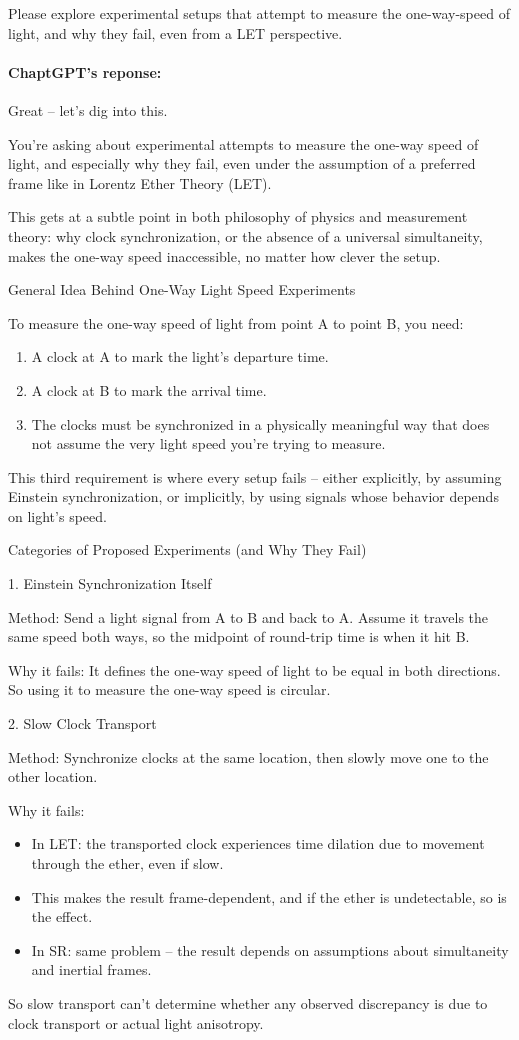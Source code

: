 \documentclass[a4paper]{article}
\theoremstyle{plain}
\theoremstyle{definition}
\begin{document}
Please explore experimental setups that attempt to measure the
one-way-speed of light, and why they fail, even from a LET
perspective.

\paragraph{ChaptGPT's reponse:}

Great -- let's dig into this.

You're asking about experimental attempts to measure the one-way speed
of light, and especially why they fail, even under the assumption of a
preferred frame like in Lorentz Ether Theory (LET).

This gets at a subtle point in both philosophy of physics and
measurement theory: why clock synchronization, or the absence of a
universal simultaneity, makes the one-way speed inaccessible, no
matter how clever the setup.

General Idea Behind One-Way Light Speed Experiments

To measure the one-way speed of light from point A to point B, you
need:
\begin{enumerate}
\item A clock at A to mark the light's departure time.
\item A clock at B to mark the arrival time.
\item The clocks must be synchronized in a physically meaningful way
  that does not assume the very light speed you're trying to measure.
\end{enumerate}
This third requirement is where every setup fails -- either
explicitly, by assuming Einstein synchronization, or implicitly, by
using signals whose behavior depends on light's speed.

Categories of Proposed Experiments (and Why They Fail)

1. Einstein Synchronization Itself

Method: Send a light signal from A to B and back to A.  Assume it
travels the same speed both ways, so the midpoint of round-trip time
is when it hit B.

Why it fails: It defines the one-way speed of light to be equal in
both directions.  So using it to measure the one-way speed is
circular.

2. Slow Clock Transport

Method: Synchronize clocks at the same location, then slowly move one
to the other location.

Why it fails:
\begin{itemize}
\item In LET: the transported clock experiences time dilation due to
  movement through the ether, even if slow.
\item This makes the result frame-dependent, and if the ether is
  undetectable, so is the effect.
\item In SR: same problem -- the result depends on assumptions about
  simultaneity and inertial frames.
\end{itemize}
So slow transport can't determine whether any observed discrepancy is
due to clock transport or actual light anisotropy.
\end{document}
